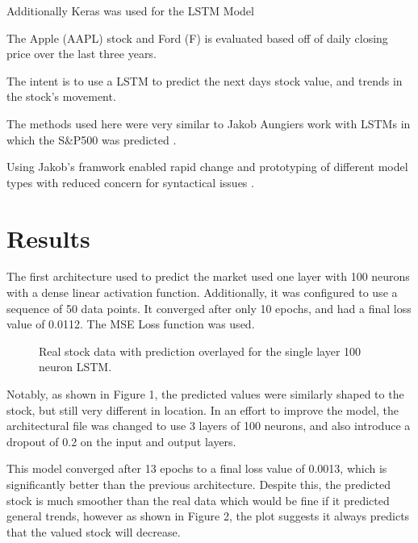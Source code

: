 \documentclass{article}
\begin{document}
    Additionally Keras was used for the LSTM Model

    The Apple (AAPL) stock and Ford (F) is evaluated based off of daily closing price over the last three years.

    The intent is to use a LSTM to predict the next days stock value, and trends in the stock's movement.

    The methods used here were very similar to Jakob Aungiers work with LSTMs in which the S\&P500 was predicted \cite[S\&P500]{web:lstm}.

    Using Jakob's framwork enabled rapid change and prototyping of different model types with reduced concern for syntactical
    issues \cite[framework]{web:lstmFramework}.

\section{Results}
    The first architecture used to predict the market used one layer with 100 neurons with a dense linear activation function.
    Additionally, it was configured to use a sequence of 50 data points. It converged after only 10 epochs, and had a final loss 
    value of 0.0112. The MSE Loss function was used.

    \begin{figure}
    \centering
    \caption{Real stock data with prediction overlayed for the single layer 100 neuron LSTM.}
    \end{figure}

    Notably, as shown in Figure 1, the predicted values were similarly shaped to the stock, but still very different in location.
    In an effort to improve the model, the architectural file was changed to use 3 layers of 100 neurons, and also 
    introduce a dropout of 0.2 on the input and output layers.

    This model converged after 13 epochs to a final loss value of 0.0013, which is significantly better than the
    previous architecture. Despite this, the predicted stock is much smoother than the real data which would be fine
    if it predicted general trends, however as shown in Figure 2, the plot suggests it always predicts that the valued stock will decrease.
\end{document}
